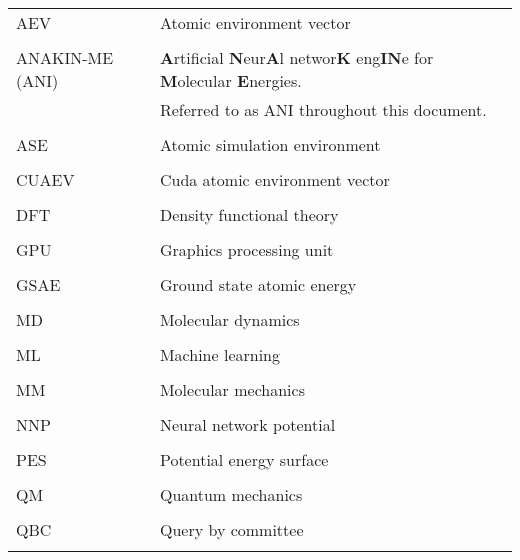 \singlespacing
\begin{tabular}{l p{5in}} 
AEV & Atomic environment vector\\
\\
ANAKIN-ME (ANI) & \textbf{A}rtificial \textbf{N}eur\textbf{A}l networ\textbf{K} eng\textbf{IN}e for \textbf{M}olecular \textbf{E}nergies.\\
 & Referred to as ANI throughout this document.\\
\\%
ASE & Atomic simulation environment\\
\\
CUAEV & Cuda atomic environment vector\\
\\
DFT & Density functional theory\\
\\
GPU & Graphics processing unit\\
\\
GSAE & Ground state atomic energy\\
\\
MD & Molecular dynamics\\
\\
ML & Machine learning\\
\\
MM & Molecular mechanics\\
\\
NNP & Neural network potential\\
\\
PES & Potential energy surface\\
\\
QM & Quantum mechanics\\
\\
QBC & Query by committee\\
\\


\end{tabular}
\doublespacing
